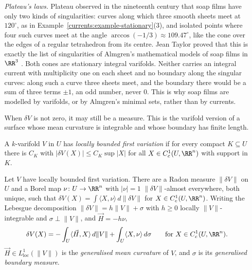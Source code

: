 \begin{remark}\label{currents:remark-plateau-laws}
\emph{Plateau's laws.} Plateau observed in the nineteenth century that soap films have only two kinds of singularities: curves along which three smooth sheets meet at $120^\circ$, as in
Example~\ref{currents:example-stationary}(3), and isolated points where four such curves meet at the angle $\arccos(-1/3) \approx 109.47^\circ$, like the cone over the edges of a regular tetrahedron from its
centre. Jean Taylor proved that this is exactly the list of singularities of Almgren's mathematical models of soap films in $\RR^3$ \cite{taylor-1976}. Both cones are stationary integral varifolds. Neither carries an
integral current with multiplicity one on each sheet and no boundary along the singular curves: along such a curve three sheets meet, and the boundary there would be a sum of three terms $\pm1$, an odd
number, never $0$. This is why soap films are modelled by varifolds, or by Almgren's minimal sets, rather than by currents.
\end{remark}

When $\delta V$ is not zero, it may still be a measure. This is the varifold version of a surface whose mean curvature is integrable and whose boundary has finite length.

\begin{definition}\label{currents:definition-bounded-first-variation}
A $k$-varifold $V$ in $U$ has \emph{locally bounded first variation} if for every compact $K \subseteq U$ there is $C_K$ with $|\delta V(X)| \leq C_K\sup|X|$ for all $X \in C^1_c(U, \RR^n)$ with support in $K$.
\end{definition}

\begin{proposition}\label{currents:proposition-generalised-mean-curvature}
Let $V$ have locally bounded first variation. There are a Radon measure $\|\delta V\|$ on $U$ and a Borel map $\nu \colon U \to \RR^n$ with $|\nu| = 1$ $\|\delta V\|$-almost everywhere, both unique, such that
$\delta V(X) = \int\langle X, \nu\rangle\,d\|\delta V\|$ for $X \in C^1_c(U, \RR^n)$. Writing the Lebesgue decomposition $\|\delta V\| = h\|V\| + \sigma$ with $h \geq 0$ locally $\|V\|$-integrable and
$\sigma \perp \|V\|$, and $\vec{H} = -h\nu$,
\[
\delta V(X) = -\int_U\langle\vec{H}, X\rangle\,d\|V\| + \int_U\langle X, \nu\rangle\,d\sigma \qquad\text{for } X \in C^1_c(U, \RR^n).
\]
$\vec{H} \in L^1_{\mathrm{loc}}(\|V\|)$ is the \emph{generalised mean curvature} of $V$, and $\sigma$ is its \emph{generalised boundary measure}.
\end{proposition}


